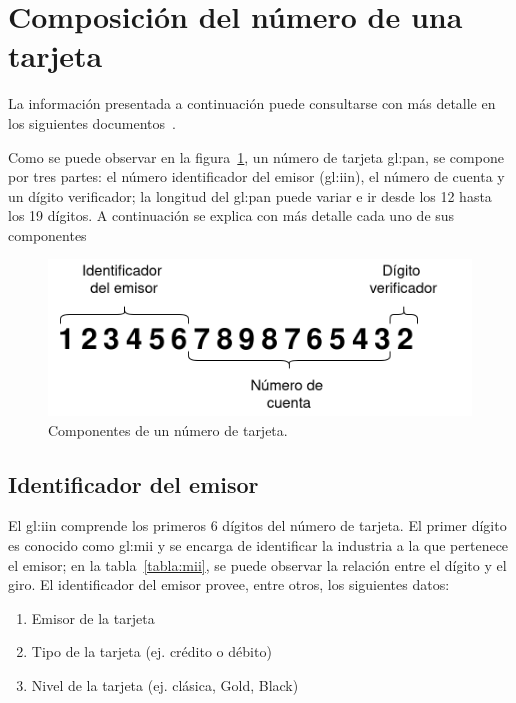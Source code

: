 %
%

\section{Composición del número de una tarjeta}

La información presentada a continuación puede consultarse con más detalle en
los siguientes documentos~\cite{iso_7812, iso_9362, pci_definitive_guide}.

Como se puede observar en la figura~\ref{figura:pan}, un número de tarjeta
\gls{gl:pan}, se compone por tres partes: el número identificador del emisor
(\gls{gl:iin}), el número de cuenta y un dígito verificador; la longitud del
\gls{gl:pan} puede variar e ir desde los 12 hasta los 19 dígitos. A
continuación se explica con más detalle cada uno de sus componentes

\begin{figure}[H]
  \begin{center}
    \includegraphics[width=0.6\linewidth]{diagramas/tarjeta}
    \caption{Componentes de un número de tarjeta.}\label{figura:pan}
   \end{center}
\end{figure}

\subsection{Identificador del emisor}
El \gls{gl:iin} comprende los primeros 6 dígitos del número de
tarjeta. El primer dígito es conocido como \gls{gl:mii} y se encarga de
identificar la industria a la que pertenece el emisor; en la
tabla~\ref{tabla:mii}, se puede observar la relación entre el dígito y el giro.
El identificador del emisor provee, entre otros, los siguientes datos:
\begin{enumerate}
    \item Emisor de la tarjeta
    \item Tipo de la tarjeta (ej. crédito o débito)
    \item Nivel de la tarjeta (ej. clásica, Gold, Black)
\end{enumerate}

